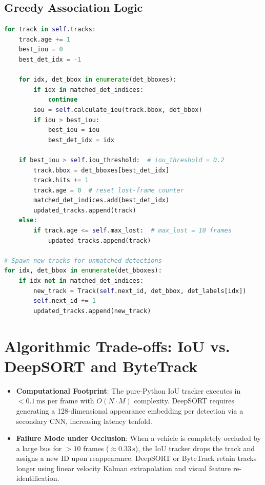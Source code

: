 \subsection{Greedy Association Logic}
\begin{lstlisting}[language=Python,caption={IoU Matching Engine (\texttt{backend/tracker\_manager.py})}]
for track in self.tracks:
    track.age += 1
    best_iou = 0
    best_det_idx = -1

    for idx, det_bbox in enumerate(det_bboxes):
        if idx in matched_det_indices:
            continue
        iou = self.calculate_iou(track.bbox, det_bbox)
        if iou > best_iou:
            best_iou = iou
            best_det_idx = idx

    if best_iou > self.iou_threshold:  # iou_threshold = 0.2
        track.bbox = det_bboxes[best_det_idx]
        track.hits += 1
        track.age = 0  # reset lost-frame counter
        matched_det_indices.add(best_det_idx)
        updated_tracks.append(track)
    else:
        if track.age <= self.max_lost:  # max_lost = 10 frames
            updated_tracks.append(track)

# Spawn new tracks for unmatched detections
for idx, det_bbox in enumerate(det_bboxes):
    if idx not in matched_det_indices:
        new_track = Track(self.next_id, det_bbox, det_labels[idx])
        self.next_id += 1
        updated_tracks.append(new_track)
\end{lstlisting}

\section{Algorithmic Trade-offs: IoU vs. DeepSORT and ByteTrack}
\begin{itemize}[leftmargin=*]
    \item \textbf{Computational Footprint}: The pure-Python IoU tracker executes in $< 0.1\,\text{ms}$ per frame with $O(N \cdot M)$ complexity. DeepSORT requires generating a 128-dimensional appearance embedding per detection via a secondary CNN, increasing latency tenfold.
    \item \textbf{Failure Mode under Occlusion}: When a vehicle is completely occluded by a large bus for $> 10$ frames ($\approx 0.33\,\text{s}$), the IoU tracker drops the track and assigns a new ID upon reappearance. DeepSORT or ByteTrack retain tracks longer using linear velocity Kalman extrapolation and visual feature re-identification.
\end{itemize}
